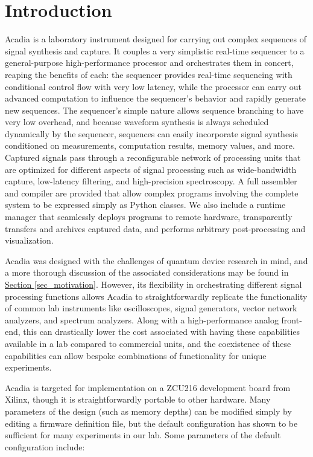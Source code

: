 \part{Introduction}

Acadia is a laboratory instrument designed for carrying out complex sequences of signal synthesis and capture. It couples a very simplistic real-time sequencer to a general-purpose high-performance processor and orchestrates them in concert, reaping the benefits of each: the sequencer provides real-time sequencing with conditional control flow with very low latency, while the processor can carry out advanced computation to influence the sequencer's behavior and rapidly generate new sequences. The sequencer's simple nature allows sequence branching to have very low overhead, and because waveform synthesis is always scheduled dynamically by the sequencer, sequences can easily incorporate signal synthesis conditioned on measurements, computation results, memory values, and more. Captured signals pass through a reconfigurable network of processing units that are optimized for different aspects of signal processing such as wide-bandwidth capture, low-latency filtering, and high-precision spectroscopy. A full assembler and compiler are provided that allow complex programs involving the complete system to be expressed simply as Python classes. We also include a runtime manager that seamlessly deploys programs to remote hardware, transparently transfers and archives captured data, and performs arbitrary post-processing and visualization.

Acadia was designed with the challenges of quantum device research in mind, and a more thorough discussion of the associated considerations may be found in \hyperref[sec_motivation]{Section \ref{sec_motivation}}. However, its flexibility in orchestrating different signal processing functions allows Acadia to straightforwardly replicate the functionality of common lab instruments like oscilloscopes, signal generators, vector network analyzers, and spectrum analyzers. Along with a high-performance analog front-end, this can drastically lower the cost associated with having these capabilities available in a lab compared to commercial units, and the coexistence of these capabilities can allow bespoke combinations of functionality for unique experiments.

Acadia is targeted for implementation on a ZCU216 development board from Xilinx, though it is straightforwardly portable to other hardware. Many parameters of the design (such as memory depths) can be modified simply by editing a firmware definition file, but the default configuration has shown to be sufficient for many experiments in our lab. Some parameters of the default configuration include:

